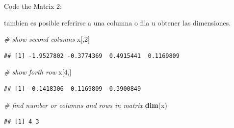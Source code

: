 \documentclass[ignorenonframetext,]{beamer}
\newenvironment{Shaded}{\begin{snugshade}}{\end{snugshade}}
\newcommand{\KeywordTok}[1]{\textcolor[rgb]{0.13,0.29,0.53}{\textbf{#1}}}
\newcommand{\DecValTok}[1]{\textcolor[rgb]{0.00,0.00,0.81}{#1}}
\newcommand{\CommentTok}[1]{\textcolor[rgb]{0.56,0.35,0.01}{\textit{#1}}}
\newcommand{\NormalTok}[1]{#1}
\begin{document}
\begin{frame}[fragile]{Code the Matrix 2:}

tambien es posible referirse a una columna o fila u obtener las
dimensiones.

\begin{Shaded}
\begin{Highlighting}[]
\CommentTok{# show second columns}
\NormalTok{x[,}\DecValTok{2}\NormalTok{]}
\end{Highlighting}
\end{Shaded}

\begin{verbatim}
## [1] -1.9527802 -0.3774369  0.4915441  0.1169809
\end{verbatim}

\begin{Shaded}
\begin{Highlighting}[]
\CommentTok{# show forth row}
\NormalTok{x[}\DecValTok{4}\NormalTok{,]}
\end{Highlighting}
\end{Shaded}

\begin{verbatim}
## [1] -0.1418306  0.1169809 -0.3900849
\end{verbatim}

\begin{Shaded}
\begin{Highlighting}[]
\CommentTok{# find number or columns and rows in matrix}
\KeywordTok{dim}\NormalTok{(x)}
\end{Highlighting}
\end{Shaded}

\begin{verbatim}
## [1] 4 3
\end{verbatim}

\end{frame}
\end{document}
